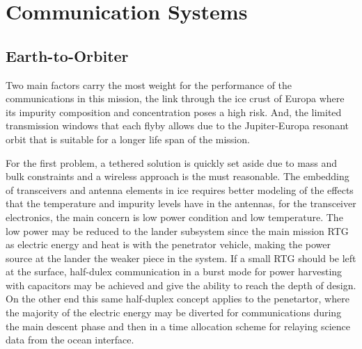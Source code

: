\chapter{Communication Systems}



\section{Earth-to-Orbiter}







	



Two main factors carry the most weight for the performance of the communications in this mission, the link through the ice crust of Europa where its impurity composition and concentration poses a high risk. And, the limited transmission windows that each flyby allows due to the Jupiter-Europa resonant orbit that is suitable for a longer life span of the mission.

For the first problem, a tethered solution is quickly set aside due to mass and bulk constraints and a wireless approach is the must reasonable. The embedding of transceivers and antenna elements in ice requires better modeling of the effects that the temperature and impurity levels have in the antennas, for the transceiver electronics, the main concern is low power condition and low temperature. The low power may be reduced to the lander subsystem since the main mission RTG as electric energy and heat is with the penetrator vehicle, making the power source at the lander the weaker piece in the system. If a small RTG should be left at the surface, half-dulex communication in a burst mode for power harvesting with capacitors may be achieved and give the ability to reach the depth of design. On the other end this same half-duplex concept applies to the penetartor, where the majority of the electric energy may be diverted for communications during the main descent phase and then in a time allocation scheme for relaying science data from the ocean interface.\\


